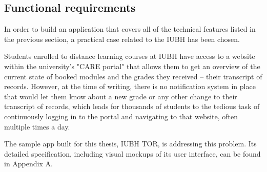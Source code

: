 \subsection{Functional requirements}

In order to build an application that covers all of the technical features listed in the previous section, a practical case related to the IUBH has been chosen.

Students enrolled to distance learning courses at IUBH have access to a website within the university's "CARE portal" that allows them to get an overview of the current state of booked modules and the grades they received – their transcript of records. However, at the time of writing, there is no notification system in place that would let them know about a new grade or any other change to their transcript of records, which leads for thousands of students to the tedious task of continuously logging in to the portal and navigating to that website, often multiple times a day. 

The sample app built for this thesis, IUBH TOR, is addressing this problem. Its detailed specification, including visual mockups of its user interface, can be found in Appendix A.
